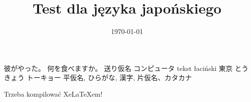 \documentclass[a4paper,12pt]{article}
\title{\sffamily\bfseries Test dla języka japońskiego}
\author{}
\date{\today}
\begin{document}
\maketitle

\ifxetex 
\section*{\XeLaTeX} 

彼がやった。 何を食べますか。 送り仮名 コンピュータ tekst łaciński
東京  とうきょう   トーキョー 平仮名, ひらがな,  漢字,  片仮名、カタカナ


\else 
Trzeba kompilować XeLaTeXem!


\fi  
\end{document}
